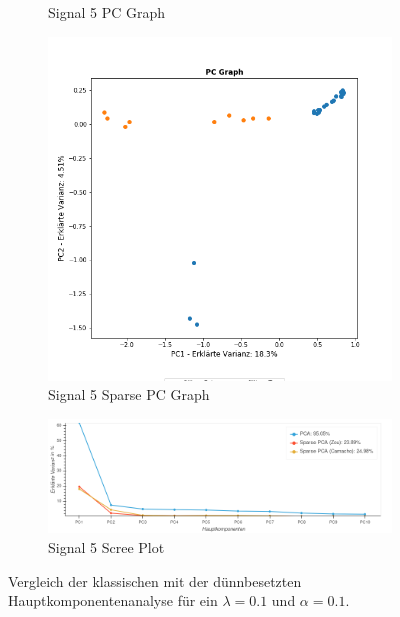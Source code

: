 \begin{figure}
\begin{subfigure}{0.45\textwidth}
\caption{Signal 5 PC Graph}
\end{subfigure}
%
\begin{subfigure}{0.45\textwidth}
\centering
\includegraphics[width = \textwidth]{figures/Signal_5_sparse_pc_graph.png}
\caption{Signal 5 Sparse PC Graph}
\end{subfigure}
%
\begin{subfigure}{0.9\textwidth}
\includegraphics[width = \textwidth]{figures/Signal_5_scree_plot_10.png}
\caption{Signal 5 Scree Plot}
\end{subfigure}
\caption{Vergleich der klassischen mit der dünnbesetzten Hauptkomponentenanalyse für ein $\lambda=0.1$ und $\alpha = 0.1$.}
\end{figure}




